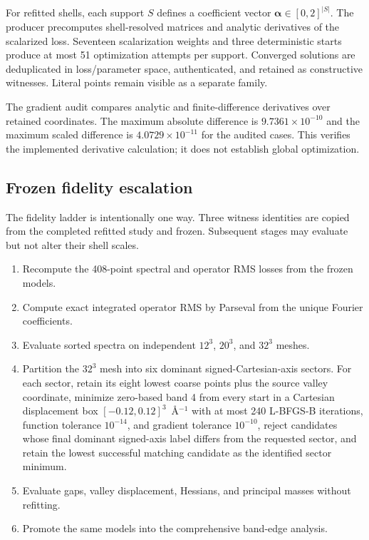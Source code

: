 \documentclass[11pt]{article}
\theoremstyle{definition}
\begin{document}
For refitted shells, each support $S$ defines a coefficient vector
$\boldsymbol\alpha\in[0,2]^{|S|}$.  The producer precomputes shell-resolved matrices and
analytic derivatives of the scalarized loss.  Seventeen scalarization weights and three
deterministic starts produce at most 51 optimization attempts per support.  Converged
solutions are deduplicated in loss/parameter space, authenticated, and retained as
constructive witnesses.  Literal points remain visible as a separate family.

The gradient audit compares analytic and finite-difference derivatives over retained
coordinates.  The maximum absolute difference is $9.7361\times10^{-10}$ and the maximum
scaled difference is $4.0729\times10^{-11}$ for the audited cases.  This verifies the
implemented derivative calculation; it does not establish global optimization.

\subsection{Frozen fidelity escalation}

The fidelity ladder is intentionally one way.  Three witness identities are copied from
the completed refitted study and frozen.  Subsequent stages may evaluate but not alter
their shell scales.

\begin{enumerate}[leftmargin=2em]
 \item Recompute the 408-point spectral and operator RMS losses from the frozen models.
 \item Compute exact integrated operator RMS by Parseval from the unique Fourier
 coefficients.
 \item Evaluate sorted spectra on independent $12^3$, $20^3$, and $32^3$ meshes.
 \item Partition the $32^3$ mesh into six dominant signed-Cartesian-axis sectors.  For
 each sector, retain its eight lowest coarse points plus the source valley coordinate,
 minimize zero-based band 4 from every start in a Cartesian displacement box
 $[-0.12,0.12]^3$~\AA$^{-1}$ with at most 240 L-BFGS-B iterations, function tolerance
 $10^{-14}$, and gradient tolerance $10^{-10}$, reject candidates whose final dominant
 signed-axis label differs from the requested sector, and retain the lowest successful
 matching candidate as the identified sector minimum.
 \item Evaluate gaps, valley displacement, Hessians, and principal masses without
 refitting.
 \item Promote the same models into the comprehensive band-edge analysis.
\end{enumerate}
\end{document}
